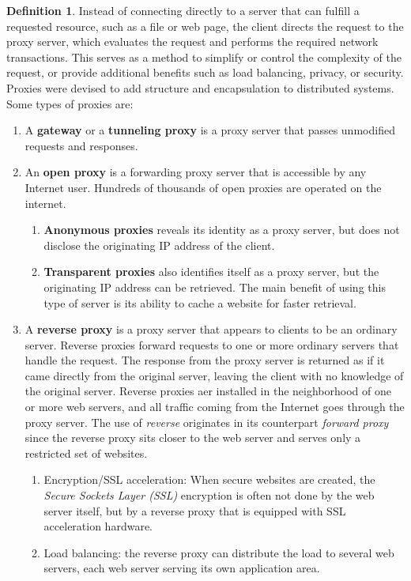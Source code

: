 \documentclass[a4paper, 12pt]{report}
\theoremstyle{remark}
\theoremstyle{definition}
\newtheorem{definition}{Definition}[section]
\begin{document}
\begin{definition}
Instead of connecting directly to a server that can fulfill a requested resource, such as a file or web page, the client directs the request to the proxy server, which evaluates the request and performs the required network transactions. This serves as a method to simplify or control the complexity of the request, or provide additional benefits such as load balancing, privacy, or security. Proxies were devised to add structure and encapsulation to distributed systems. Some types of proxies are: 
\begin{enumerate}
    \item A \textbf{gateway} or a \textbf{tunneling proxy} is a proxy server that passes unmodified requests and responses. 
    \item An \textbf{open proxy} is a forwarding proxy server that is accessible by any Internet user. Hundreds of thousands of open proxies are operated on the internet. 
    \begin{enumerate}
        \item \textbf{Anonymous proxies} reveals its identity as a proxy server, but does not disclose the originating IP address of the client. 
        \item \textbf{Transparent proxies} also identifies itself as a proxy server, but the originating IP address can be retrieved. The main benefit of using this type of server is its ability to cache a website for faster retrieval. 
    \end{enumerate}
    \item A \textbf{reverse proxy} is a proxy server that appears to clients to be an ordinary server. Reverse proxies forward requests to one or more ordinary servers that handle the request. The response from the proxy server is returned as if it came directly from the original server, leaving the client with no knowledge of the original server. Reverse proxies aer installed in the neighborhood of one or more web servers, and all traffic coming from the Internet goes through the proxy server. The use of \textit{reverse} originates in its counterpart \textit{forward proxy} since the reverse proxy sits closer to the web server and serves only a restricted set of websites. 
    \begin{enumerate}
        \item Encryption/SSL acceleration: When secure websites are created, the \textit{Secure Sockets Layer (SSL)} encryption is often not done by the web server itself, but by a reverse proxy that is equipped with SSL acceleration hardware. 
        \item Load balancing: the reverse proxy can distribute the load to several web servers, each web server serving its own application area. 

\end{enumerate}
\end{enumerate}
\end{definition}
\end{document}
